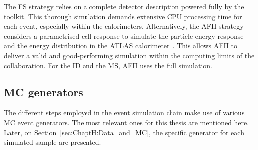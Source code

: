 The FS strategy relies on a complete %
detector description powered fully by the \GEANT toolkit. %
This thorough simulation demands extensive CPU processing time for each event, 
especially within the calorimeters. 
Alternatively, the AFII strategy considers 
a parametrised cell response to simulate
the particle-energy response and the energy distribution in the ATLAS calorimeter~\cite{ATLAS:2010bfa, Yamanaka:2011zz}.
This allows AFII to deliver a valid and good-performing simulation within the computing limits of the collaboration.
For the ID and the MS, AFII uses the full \GEANT simulation.

\subsection{MC generators}
\label{sec:Chap3.1:MC:Generators}
The different steps employed in the event simulation chain make use of various
MC event generators. The most relevant ones for this thesis are mentioned here.
Later, on Section~\ref{sec:ChaptH:Data_and_MC}, the specific generator for
each simulated sample are presented.

